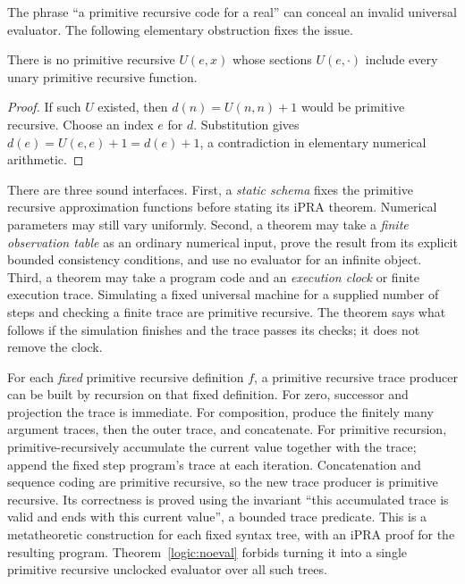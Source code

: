 The phrase ``a primitive recursive code for a real'' can conceal an invalid
universal evaluator.  The following elementary obstruction fixes the issue.

\begin{theorem}
\label{logic:noeval}
There is no primitive recursive $U(e,x)$ whose sections $U(e,\cdot)$ include
every unary primitive recursive function.
\end{theorem}
\begin{proof}
If such $U$ existed, then $d(n)=U(n,n)+1$ would be primitive recursive.
Choose an index $e$ for $d$.  Substitution gives
$d(e)=U(e,e)+1=d(e)+1$, a contradiction in elementary numerical arithmetic.
\end{proof}

There are three sound interfaces.  First, a \emph{static schema} fixes the
primitive recursive approximation functions before stating its iPRA theorem.
Numerical parameters may still vary uniformly.  Second, a theorem may take a
\emph{finite observation table} as an ordinary numerical input, prove the
result from its explicit bounded consistency conditions, and use no evaluator
for an infinite object.  Third, a theorem may take a program code and an
\emph{execution clock} or finite execution trace.  Simulating a fixed
universal machine for a supplied number of steps and checking a finite trace
are primitive recursive.  The theorem says what follows if the simulation
finishes and the trace passes its checks; it does not remove the clock.

For each \emph{fixed} primitive recursive definition $f$, a primitive
recursive trace producer can be built by recursion on that fixed definition.
For zero, successor and projection the trace is immediate.  For composition,
produce the finitely many argument traces, then the outer trace, and
concatenate.  For primitive recursion, primitive-recursively accumulate the
current value together with the trace; append the fixed step program's trace
at each iteration.  Concatenation and sequence coding are primitive recursive,
so the new trace producer is primitive recursive.  Its correctness is proved
using the invariant ``this accumulated trace is valid and ends with this
current value'', a bounded trace predicate.  This is a metatheoretic
construction for each fixed syntax tree, with an iPRA proof for the resulting
program.  Theorem~\ref{logic:noeval} forbids turning it into a single
primitive recursive unclocked evaluator over all such trees.

